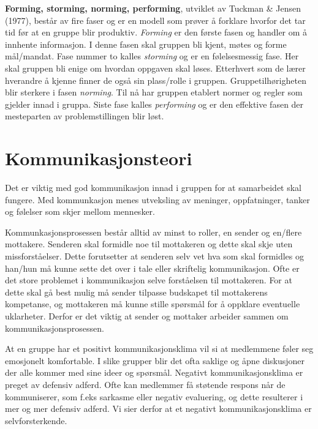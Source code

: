 \textbf{Forming, storming, norming, performing}, utviklet av Tuckman \& Jensen (1977), består av fire faser og er en modell som prøver å forklare hvorfor det tar tid før at en gruppe blir produktiv.
\textit{Forming} er den første fasen og handler om å innhente informasjon. 
I denne fasen skal gruppen bli kjent, møtes og forme mål/mandat.
Fase nummer to kalles \textit{storming} og er en følelsesmessig fase. 
Her skal gruppen bli enige om hvordan oppgaven skal løses. 
Etterhvert som de lærer hverandre å kjenne finner de også sin plass/rolle i gruppen. 
Gruppetilhørigheten blir sterkere i fasen \textit{norming}. 
Til nå har gruppen etablert normer og regler som gjelder innad i gruppa. 
Siste fase kalles \textit{performing} og er den effektive fasen der mesteparten av problemstillingen blir løst. 

\section{Kommunikasjonsteori}
Det er viktig med god kommunikasjon innad i gruppen for at samarbeidet skal fungere. 
Med kommunkasjon menes utveksling av meninger, oppfatninger, tanker og følelser som skjer mellom mennesker.
\vspace{\secspace}

Kommunkasjonsprosessen består alltid av minst to roller, en sender og en/flere mottakere. 
Senderen skal formidle noe til mottakeren og dette skal skje uten missforståelser. 
Dette forutsetter at senderen selv vet hva som skal formidles og han/hun må kunne sette det over i tale eller skriftelig kommunikasjon. 
Ofte er det store problemet i kommunikasjon selve forståelsen til mottakeren. 
For at dette skal gå best mulig må sender tilpasse budskapet til mottakerens kompetanse, og mottakeren må kunne stille spørsmål for å oppklare eventuelle uklarheter. 
Derfor er det viktig at sender og mottaker arbeider sammen om kommunikasjonsprosessen.
\vspace{\secspace}

At en gruppe har et positivt kommunikasjonsklima vil si at medlemmene føler seg emosjonelt komfortable. 
I slike grupper blir det ofta saklige og åpne diskusjoner der alle kommer med sine ideer og spørsmål. 
Negativt kommunikasjonsklima er preget av defensiv adferd. 
Ofte kan medlemmer få støtende respons når de kommuniserer, som f.eks sarkasme eller negativ evaluering, og dette resulterer i mer og mer defensiv adferd. 
Vi sier derfor at et negativt kommunikasjonsklima er selvforsterkende. 
\vspace{\secspace}

